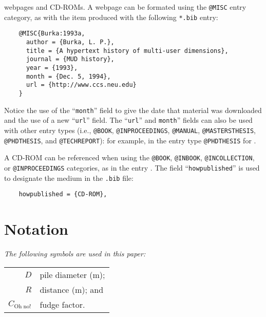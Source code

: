 \documentclass[NewProceedings,letterpaper]{ascelike-new}
\begin{document}
webpages and CD-ROMs.  A webpage can be formated using the
\texttt{@MISC} entry category, as with the item \cite{Burka:1993a} produced
with the following \texttt{*.bib} entry:
\begin{verbatim}
    @MISC{Burka:1993a,
      author = {Burka, L. P.},
      title = {A hypertext history of multi-user dimensions},
      journal = {MUD history},
      year = {1993},
      month = {Dec. 5, 1994},
      url = {http://www.ccs.neu.edu}
    }
\end{verbatim}
Notice the use of the ``\texttt{month}'' field to give the date that material
was downloaded and the use of a new ``\texttt{url}'' field.
The ``\texttt{url}'' and \texttt{month}''
fields can also be used with other entry types
(i.e., \texttt{@BOOK}, \texttt{@INPROCEEDINGS}, \texttt{@MANUAL},
\texttt{@MASTERSTHESIS}, \texttt{@PHDTHESIS}, and \texttt{@TECHREPORT}):
for example, in the entry type \texttt{@PHDTHESIS} for \cite{Wichtmann:2005a}.
%
\par
A CD-ROM can be referenced when using the \texttt{@BOOK}, \texttt{@INBOOK},
\texttt{@INCOLLECTION}, or \texttt{@INPROCEEDINGS} categories,
as in the entry \cite{Liggett:1998a}.
The field ``\texttt{howpublished}'' is used to designate the medium
in the \texttt{.bib} file:
\begin{verbatim}
    howpublished = {CD-ROM},
\end{verbatim}
%
\pagebreak
%
\appendix
%
%
\section{Notation}
\label{app:notation}
\emph{The following symbols are used in this paper:}%
\nopagebreak
\par
\begin{tabular}{r  @{\hspace{1em}=\hspace{1em}}  l}
	$D$                    & pile diameter (m);     \\
	$R$                    & distance (m);      and \\
	$C_{\mathrm{Oh\;no!}}$ & fudge factor.
\end{tabular}
\end{document}
